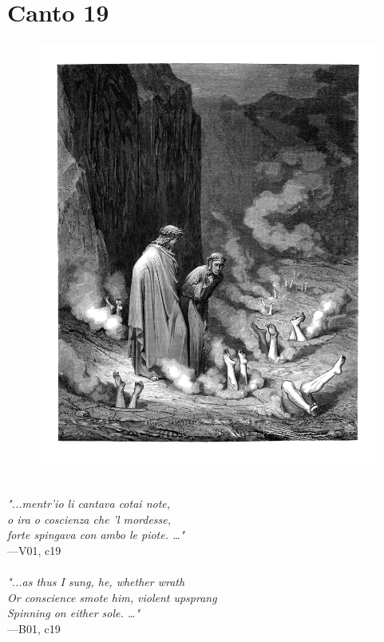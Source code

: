 \documentclass[../Dore_vision.tex]{subfiles}
\begin{document}
\section{Canto 19}

\begin{figure}[ht]
\centering
\includegraphics[height=\figsize]{illustrations/book_1/V01, c19.jpg}
\end{figure}

\begin{center}
\begin{minipage}{0.8\linewidth}
\textit{\\
"...mentr’io li cantava cotai note,\\o ira o coscienza che ’l mordesse,\\forte spingava con ambo le piote. …"} \\
—V01, c19 \\~\\
\textit{"...as thus I sung, he, whether wrath\\Or conscience smote him, violent upsprang\\Spinning on either sole. …"} \\
—B01, c19
\end{minipage}
\end{center}
\end{document}
